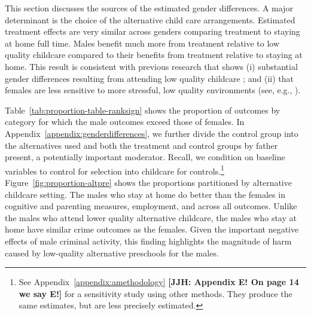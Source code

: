 This section discusses the sources of the estimated gender differences. A major determinant is the choice of the alternative child care arrangements.
Estimated treatment effects are very similar across genders comparing treatment to staying at home full time. Males benefit much more from treatment relative to low quality childcare compared to their benefits from treatment relative to staying at home. This result is consistent with previous research that shows (i) substantial gender differences resulting from attending low quality childcare \citep{Kottelenberg-Lehrer_2014_Gender-Effects,Baker_Gruber_Milligan_2015_Noncog_Defects}; and (ii) that females are less sensitive to more stressful, low quality environments (see, e.g., \citealp{golding2016psychology,Autor-etal_2015_Family-Disadvantage}).

Table~\ref{tab:proportion-table-ranksign} shows the proportion of outcomes by category for which the male outcomes exceed those of females. In Appendix~\ref{appendix:genderdifferences}, we further divide the control group into the alternatives used and both the treatment and control groups by father present, a potentially important moderator. Recall, we condition on baseline variables to control for selection into childcare for controls.\footnote{See Appendix~\ref{appendix:amethodology} \textbf{[JJH: Appendix E! On page 14 we say E!]} for a sensitivity study using other methods. They produce the same estimates, but are less precisely estimated.} Figure~\ref{fig:proportion-altpre} shows the proportions partitioned by alternative childcare setting. The males who stay at home do better than the females in cognitive and parenting measures, employment, and across all outcomes. Unlike the males who attend lower quality alternative childcare, the males who stay at home have similar crime outcomes as the females. Given the important negative effects of male criminal activity, this finding highlights the magnitude of harm caused by low-quality alternative preschools for the males.

